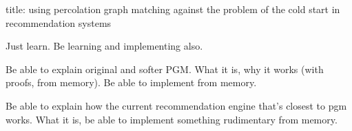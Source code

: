 
title: using percolation graph matching against the problem of the cold start in recommendation systems

Just learn. Be learning and implementing also.

Be able to explain original and softer PGM. What it is, why it works (with proofs, from memory). Be able to implement from memory.

Be able to explain how the current recommendation engine that's closest to pgm works. What it is, be able to implement something rudimentary from memory.
